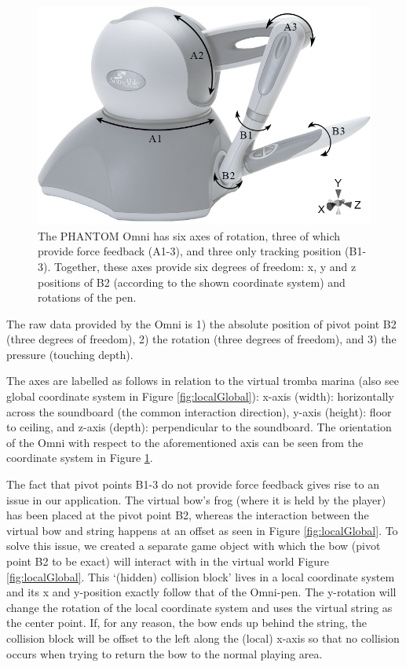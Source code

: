 \documentclass[dvipsnames, pdftex]{article}
\begin{document}
\begin{figure}[t]\includegraphics[width=1.0\columnwidth]{figures/omniSchematic.png}
\centering
  \caption{The PHANTOM Omni has six axes of rotation, three of which provide force feedback (A1-3), and three only tracking position (B1-3). Together, these axes provide six degrees of freedom: x, y and z positions of B2 (according to the shown coordinate system) and rotations of the pen. \label{fig:omni}}
\end{figure}

The raw data provided by the Omni is 1) the absolute position of pivot point B2 (three degrees of freedom), 2) the rotation (three degrees of freedom), and 3) the pressure (touching depth).

The axes are labelled as follows in relation to the virtual tromba marina (also see global coordinate system in Figure \ref{fig:localGlobal}): x-axis (width): horizontally across the soundboard (the common interaction direction), y-axis (height): floor to ceiling, and z-axis (depth): perpendicular to the soundboard. The orientation of the Omni with respect to the aforementioned axis can be seen from the coordinate system in Figure \ref{fig:omni}.

The fact that pivot points B1-3 do not provide force feedback gives rise to an issue in our application. The virtual bow's frog (where it is held by the player) has been placed at the pivot point B2, whereas the interaction between the virtual bow and string happens at an offset as seen in Figure \ref{fig:localGlobal}. To solve this issue, we created a separate game object with which the bow (pivot point B2 to be exact) will interact with in the virtual world Figure \ref{fig:localGlobal}. This `(hidden) collision block' lives in a local coordinate system and its x and y-position exactly follow that of the Omni-pen. The y-rotation will change the rotation of the local coordinate system and uses the virtual string as the center point. If, for any reason, the bow ends up behind the string, the collision block will be offset to the left along the (local) x-axis so that no collision occurs when trying to return the bow to the normal playing area. 
\end{document}
